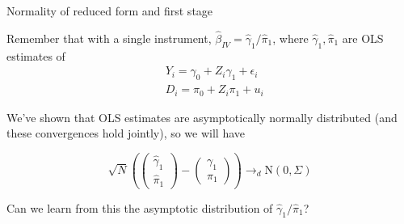 \documentclass[11pt,english,handout]{beamer}
\newenvironment{wideitemize}{\itemize\addtolength{\itemsep}{10pt}}{\enditemize}
\begin{document}
\begin{frame}{Normality of reduced form and first stage}
	\begin{wideitemize}
		\item
		Remember that with a single instrument, $\hat\beta_{IV} = \hat\gamma_1 / \hat\pi_1$, where $\hat\gamma_1,\hat\pi_1$ are OLS estimates of
		\begin{align*}
			&Y_{i} = \gamma_0 +   Z_i \gamma_1 + \epsilon_{i} \\
			&D_i = \pi_0 + Z_i \pi_1 + u_i
		\end{align*}
	
		\pause
		\item
		We've shown that OLS estimates are asymptotically normally distributed (and these convergences hold jointly), so we will have
		
		$$\sqrt{N}\left( \left( \begin{array}{ll} \hat\gamma_1 \\ \hat\pi_1 \end{array} \right)- \left( \begin{array}{ll} \gamma_1 \\ \pi_1 \end{array} \right) \right) \rightarrow_d \mathrm{N}(0,\Sigma)$$
	
		\pause
		\item
		Can we learn from this the asymptotic distribution of $\hat\gamma_1 / \hat\pi_1$?
	\end{wideitemize}
\end{frame}
\end{document}
